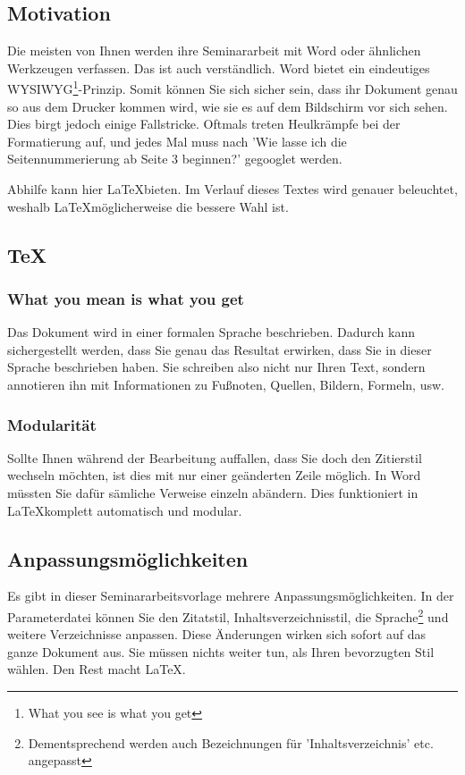 \subsection{Motivation}
    Die meisten von Ihnen werden ihre Seminararbeit mit Word oder ähnlichen Werkzeugen verfassen. Das ist auch verständlich.
    Word bietet ein eindeutiges WYSIWYG\footnote{What you see is what you get}-Prinzip. Somit können Sie sich sicher sein, dass ihr Dokument genau so aus dem Drucker kommen wird,
    wie sie es auf dem Bildschirm vor sich sehen.
    Dies birgt jedoch einige Fallstricke. Oftmals treten Heulkrämpfe bei der Formatierung auf, und jedes Mal muss nach 'Wie lasse ich die Seitennummerierung ab Seite 3 beginnen?' gegooglet werden.
    
    Abhilfe kann hier \LaTeX bieten. Im Verlauf dieses Textes wird genauer beleuchtet, weshalb \LaTeX möglicherweise die bessere Wahl ist.

\subsection{TeX}
\subsubsection{What you mean is what you get}
    Das Dokument wird in einer formalen Sprache beschrieben. Dadurch kann sichergestellt werden, dass Sie genau das Resultat erwirken, dass Sie in dieser Sprache beschrieben haben.
    Sie schreiben also nicht nur Ihren Text, sondern annotieren ihn mit Informationen zu Fußnoten, Quellen, Bildern, Formeln, usw.
    
\subsubsection{Modularität}
    Sollte Ihnen während der Bearbeitung auffallen, dass Sie doch den Zitierstil wechseln möchten, ist dies mit nur einer geänderten Zeile möglich.
    In Word müssten Sie dafür sämliche Verweise einzeln abändern. Dies funktioniert in \LaTeX komplett automatisch und modular.

\subsection{Anpassungsmöglichkeiten}
Es gibt in dieser Seminararbeitsvorlage mehrere Anpassungsmöglichkeiten. In der Parameterdatei können Sie den Zitatstil, Inhaltsverzeichnisstil, die Sprache\footnote{Dementsprechend werden auch Bezeichnungen für 'Inhaltsverzeichnis' etc. angepasst}
und weitere Verzeichnisse anpassen. Diese Änderungen wirken sich sofort auf das ganze Dokument aus. Sie müssen nichts weiter tun, als Ihren bevorzugten Stil wählen. Den Rest macht \LaTeX.
